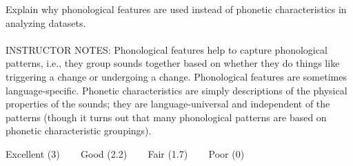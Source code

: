 \documentclass[12pt]{article}
\begin{document}
Explain why phonological features are used instead of phonetic characteristics in analyzing datasets.\\


~\\
INSTRUCTOR NOTES: Phonological features help to capture phonological patterns, i.e., they group sounds together based on whether they do things like triggering a change or undergoing a change. Phonological features are sometimes language-specific. Phonetic characteristics are simply descriptions of the physical properties of the sounds; they are language-universal and independent of the patterns (though it turns out that many phonological patterns are based on phonetic characteristic groupings).


\vfill
Excellent (3) ~~~ Good (2.2) ~~~ Fair (1.7) ~~~ Poor (0)
\newpage

\begin{center}
\textbf{{\color{red}{\HUGE END OF EXAM}}}\\

\end{center}
\newpage
\end{document}
